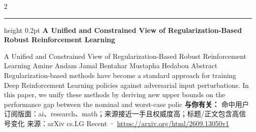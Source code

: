 \documentclass[10.5pt]{ctexart}
\begin{document}
\begin{multicols}{2}
\hrule height 0.2pt
\vspace{2mm}
{\large\bfseries A Unified and Constrained View of Regularization-Based Robust Reinforcement Learning}\par
A Unified and Constrained View of Regularization-Based Robust Reinforcement Learning Amine Andam Jamal Bentahar Mustapha Hedabou Abstract Regularization-based methods have become a standard approach for training Deep Reinforcement Learning policies against adversarial input perturbations. In this paper, we unify these methods by deriving new upper bounds on the performance gap between the nominal and worst-case polic
\textbf{与你有关：} 命中用户订阅版面：ai、research、math；来源接近一手且权威度高；标题/正文包含高信号变化
{\footnotesize\color{ormuted} 来源：arXiv cs.LG Recent · \url{https://arxiv.org/html/2609.13050v1}}
\end{multicols}
\end{document}
